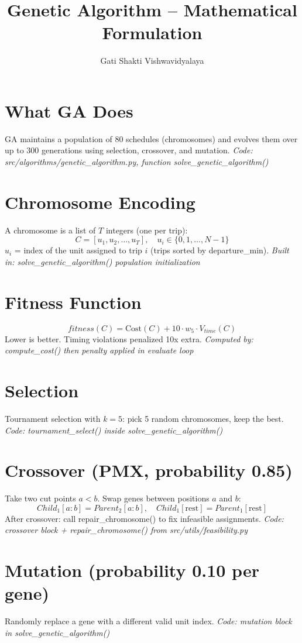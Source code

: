 \documentclass{article}
\title{Genetic Algorithm -- Mathematical Formulation}
\author{Gati Shakti Vishwavidyalaya}
\date{}
\begin{document}
\maketitle

\section{What GA Does}
GA maintains a population of 80 schedules (chromosomes) and evolves them
over up to 300 generations using selection, crossover, and mutation.
\textit{Code: src/algorithms/genetic\_algorithm.py, function solve\_genetic\_algorithm()}

\section{Chromosome Encoding}
A chromosome is a list of $T$ integers (one per trip):
\[
  C = [u_1, u_2, \ldots, u_T], \quad u_i \in \{0, 1, \ldots, N-1\}
\]
$u_i$ = index of the unit assigned to trip $i$ (trips sorted by departure\_min).
\textit{Built in: solve\_genetic\_algorithm() population initialization}

\section{Fitness Function}
\[
  fitness(C) = \text{Cost}(C) + 10 \cdot w_5 \cdot V_{time}(C)
\]
Lower is better. Timing violations penalized 10x extra.
\textit{Computed by: compute\_cost() then penalty applied in evaluate loop}

\section{Selection}
Tournament selection with $k=5$: pick 5 random chromosomes, keep the best.
\textit{Code: tournament\_select() inside solve\_genetic\_algorithm()}

\section{Crossover (PMX, probability 0.85)}
Take two cut points $a < b$. Swap genes between positions $a$ and $b$:
\[
  Child_1[a:b] = Parent_2[a:b], \quad Child_1[\text{rest}] = Parent_1[\text{rest}]
\]
After crossover: call repair\_chromosome() to fix infeasible assignments.
\textit{Code: crossover block + repair\_chromosome() from src/utils/feasibility.py}

\section{Mutation (probability 0.10 per gene)}
Randomly replace a gene with a different valid unit index.
\textit{Code: mutation block in solve\_genetic\_algorithm()}
\end{document}
